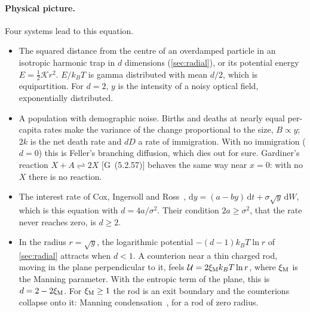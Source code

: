 \documentclass[11pt]{article}
\numberwithin{equation}{section}
\newcommand{\dd}{\mathrm{d}}
\newcommand{\G}[1]{[G~(#1)]}
\begin{document}
\paragraph{Physical picture.} Four systems lead to this equation.
\begin{itemize}
  \item The squared distance from the centre of an overdamped particle in an isotropic harmonic trap in $d$
        dimensions (\cref{sec:radial}), or its potential energy $E=\frac12\mathcal Kr^2$. $E/k_BT$ is gamma
        distributed with mean $d/2$, which is equipartition. For $d=2$, $y$ is the intensity of a noisy optical field,
        exponentially distributed.
  \item A population with demographic noise. Births and deaths at nearly equal per-capita rates make the variance of
        the change proportional to the size, $B\propto y$; $2k$ is the net death rate and $dD$ a rate of immigration.
        With no immigration ($d=0$) this is Feller's branching diffusion, which dies out for sure. Gardiner's reaction
        $X+A\rightleftharpoons2X$ \G{5.2.57} behaves the same way near $x=0$: with no $X$ there is no reaction.
  \item The interest rate of Cox, Ingersoll and Ross~\cite{cir}, $\dd y=(a-by)\,\dd t+\sigma\sqrt y\,\dd W$, which is
        this equation with $d=4a/\sigma^2$. Their condition $2a\ge\sigma^2$, that the rate never reaches zero, is
        $d\ge2$.
  \item In the radius $r=\sqrt y$, the logarithmic potential $-(d-1)k_BT\ln r$ of \cref{sec:radial} attracts when
        $d<1$. A counterion near a thin charged rod, moving in the plane perpendicular to it, feels
        $\mathcal U=2\xi_{\rm M}k_BT\ln r$, where $\xi_{\rm M}$ is the Manning parameter. With the entropic term of the
        plane, this is $d=2-2\xi_{\rm M}$. For $\xi_{\rm M}\ge1$ the rod is an exit boundary and the counterions
        collapse onto it: Manning condensation~\cite{manning}, for a rod of zero radius.
\end{itemize}
\end{document}
